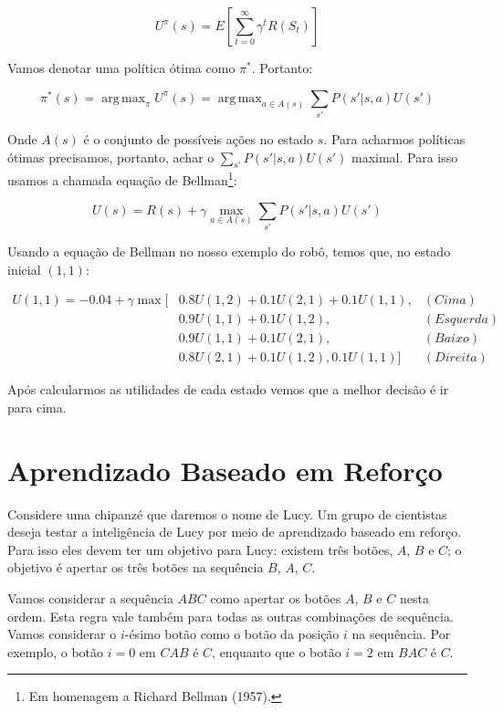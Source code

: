 \documentclass[a4paper,10pt]{article}
\DeclareMathOperator*{\argmax}{arg\,max}
\theoremstyle{plain}
\begin{document}
\begin{equation*}
  U^\pi(s) = E\left[\sum_{t=0}^\infty \gamma^t R(S_t)\right]
\end{equation*}

Vamos denotar uma política ótima como $\pi^*$. Portanto:

\begin{equation*}
  \pi^*(s) = \argmax_\pi U^\pi(s) = \argmax_{a \in A(s)} \sum_{s'} P(s'|s,a)U(s')
\end{equation*}

Onde $A(s)$ é o conjunto de possíveis ações no estado $s$. Para acharmos políticas ótimas
precisamos, portanto, achar o $\sum_{s'}P(s'|s,a)U(s')$ maximal. Para isso usamos a chamada equação
de Bellman\footnote{Em homenagem a Richard Bellman (1957).}:

\begin{equation*}
  U(s) = R(s) + \gamma \max_{a \in A(s)} \sum_{s'} P(s'|s,a)U(s')
\end{equation*}

Usando a equação de Bellman no nosso exemplo do robô, temos que, no estado inicial $(1, 1)$:

\begin{align*}
  U(1, 1) = -0.04 + \gamma \max[&0.8 U(1, 2) + 0.1 U(2, 1) + 0.1 U(1, 1), &(Cima) \\
                                &0.9 U(1, 1) + 0.1 U(1, 2), &(Esquerda) \\
                                &0.9 U(1, 1) + 0.1 U(2, 1), &(Baixo) \\
                                &0.8 U(2, 1) + 0.1 U(1, 2), 0.1U(1, 1)] &(Direita)
\end{align*}

Após calcularmos as utilidades de cada estado vemos que a melhor decisão é ir para cima.

\section{Aprendizado Baseado em Reforço}

Considere uma chipanzé que daremos o nome de Lucy. Um grupo de cientistas deseja testar a
inteligência de Lucy por meio de aprendizado baseado em reforço. Para isso eles devem ter um
objetivo para Lucy: existem três botões, $A$, $B$ e $C$; o objetivo é apertar os três botões na
sequência $B$, $A$, $C$.

Vamos considerar a sequência $ABC$ como apertar os botões $A$, $B$ e $C$ nesta ordem. Esta regra
vale também para todas as outras combinações de sequência. Vamos considerar o $i$-ésimo botão como
o botão da posição $i$ na sequência. Por exemplo, o botão $i=0$ em $CAB$ é $C$, enquanto que o
botão $i=2$ em $BAC$ é $C$.
\end{document}
